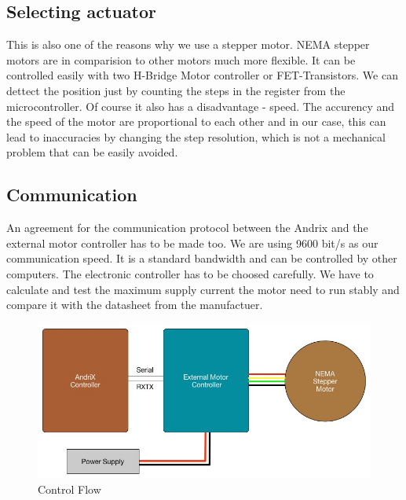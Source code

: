 \documentclass[11pt,a4paper]{article}
\begin{document}
\subsection{Selecting actuator}
This is also one of the reasons why we use a stepper motor. NEMA stepper motors are in comparision to other motors much more flexible. It can be controlled easily with two H-Bridge Motor controller or FET-Transistors. We can dettect the position just by counting the steps in the register from the microcontroller. Of course it also has a disadvantage - speed. The accurency and the speed of the motor are proportional to each other and in our case, this can lead to inaccuracies by changing the step resolution, which is not a mechanical problem that can be easily avoided.\\

\subsection{Communication}
An agreement for the communication protocol between the Andrix and the external motor controller has to be made too. We are using 9600 bit/s as our communication speed. It is a standard bandwidth and can be controlled by other computers. The electronic controller has to be choosed carefully. We have to calculate and test the maximum supply current the motor need to run stably and compare it with the datasheet from the manufactuer.\\

\begin{figure}[htp]
	\centering
	\includegraphics[scale=0.4]{img/Connection_Plan.jpg}
	\caption{Control Flow}
	\label{fig:Axis Plan}
\end{figure}


\end{document}
